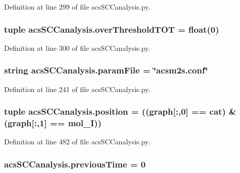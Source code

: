 Definition at line 299 of file acs\-S\-C\-Canalysis.\-py.

\hypertarget{a00102_a93de20dd9ebf791127ac5aefc0a2df8d}{
\subsubsection[{over\-Threshold\-T\-O\-T}]{\setlength{\rightskip}{0pt plus 5cm}tuple acs\-S\-C\-Canalysis.\-over\-Threshold\-T\-O\-T = float(0)}}\label{a00102_a93de20dd9ebf791127ac5aefc0a2df8d}


Definition at line 300 of file acs\-S\-C\-Canalysis.\-py.

\hypertarget{a00102_a7160f8e48b4aafebbd75e9037fc9fef7}{
\subsubsection[{param\-File}]{\setlength{\rightskip}{0pt plus 5cm}string acs\-S\-C\-Canalysis.\-param\-File = \char`\"{}acsm2s.\-conf\char`\"{}}}\label{a00102_a7160f8e48b4aafebbd75e9037fc9fef7}


Definition at line 241 of file acs\-S\-C\-Canalysis.\-py.

\hypertarget{a00102_ac09e85f8df5b7c8c7d2caf87e9193421}{
\subsubsection[{position}]{\setlength{\rightskip}{0pt plus 5cm}tuple acs\-S\-C\-Canalysis.\-position = (({\bf graph}\mbox{[}\-:,0\mbox{]} == {\bf cat}) \& ({\bf graph}\mbox{[}\-:,1\mbox{]} == {\bf mol\-\_\-\-I}))}}\label{a00102_ac09e85f8df5b7c8c7d2caf87e9193421}


Definition at line 482 of file acs\-S\-C\-Canalysis.\-py.

\hypertarget{a00102_aff96a31e98ac46cb47a67b74f5d87351}{
\subsubsection[{previous\-Time}]{\setlength{\rightskip}{0pt plus 5cm}acs\-S\-C\-Canalysis.\-previous\-Time = 0}}\label{a00102_aff96a31e98ac46cb47a67b74f5d87351}


